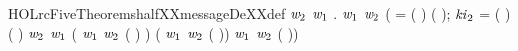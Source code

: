 \begin{SaveVerbatim}{HOLrcFiveTheoremshalfXXmessageDeXXdef}
\HOLTokenTurnstile{} \HOLSymConst{\HOLTokenForall{}}\ensuremath{\HOLBoundVar{w}\sb{\mathrm{2}}} \ensuremath{\HOLBoundVar{w}\sb{\mathrm{1}}}  .
      \ensuremath{\HOLBoundVar{w}\sb{\mathrm{1}}} \ensuremath{\HOLBoundVar{w}\sb{\mathrm{2}}}   \HOLSymConst{=}
     (
         =  ( \HOLSymConst{\ensuremath{-}} ) ( );
        \ensuremath{\HOLBoundVar{ki}\sb{\mathrm{2}}} =  ( \HOLSymConst{\ensuremath{-}} ) ( )
          \HOLSymConst{=}   \ensuremath{\HOLBoundVar{w}\sb{\mathrm{2}}}
           \HOLSymConst{=}   \ensuremath{\HOLBoundVar{w}\sb{\mathrm{1}}}
          ( \ensuremath{\HOLBoundVar{w}\sb{\mathrm{1}}} \ensuremath{\HOLBoundVar{w}\sb{\mathrm{2}}}  ( \HOLSymConst{\ensuremath{-}} ) \HOLSymConst{\ensuremath{-}} ) \HOLSymConst{\HOLTokenRor{}}
           ( \ensuremath{\HOLBoundVar{w}\sb{\mathrm{1}}} \ensuremath{\HOLBoundVar{w}\sb{\mathrm{2}}}  ( \HOLSymConst{\ensuremath{-}} )) \HOLSymConst{\HOLTokenEor{}}
           \ensuremath{\HOLBoundVar{w}\sb{\mathrm{1}}} \ensuremath{\HOLBoundVar{w}\sb{\mathrm{2}}}  ( \HOLSymConst{\ensuremath{-}} ))
\end{SaveVerbatim}
\newcommand{\HOLrcFiveTheoremshalfXXmessageDeXXdef}{\UseVerbatim{HOLrcFiveTheoremshalfXXmessageDeXXdef}}
